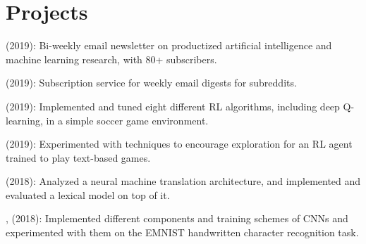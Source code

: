 \documentclass[]{deedy-resume-openfont}
\begin{document}
\begin{minipage}[t]{0.66\textwidth}


\section{Projects}

\href{https://dynamicallytyped.com}{} (2019): Bi-weekly email newsletter on productized artificial intelligence and machine learning research, with 80+ subscribers.

\vspace{0.3\topsep}
\href{https://weekly.cool}{} (2019): Subscription service for weekly email digests for subreddits.

\vspace{0.3\topsep}
\href{https://leonoverweel.com/projects/2019/rl-coursework/}{} (2019): Implemented and tuned eight different RL algorithms, including deep Q-learning, in a simple soccer game environment.

\vspace{0.3\topsep}
\href{https://leonoverweel.com/projects/2019/mlp-textworld-lstm-dqn/}{} (2019): Experimented with techniques to encourage exploration for an RL agent trained to play text-based games.

\vspace{0.3\topsep}
\href{https://leonoverweel.com/projects/2019/nlu-coursework/}{} (2018): Analyzed a neural machine translation architecture, and implemented and evaluated a lexical model on top of it.

\vspace{0.3\topsep}
\href{https://leonoverweel.com/projects/2018/mlp-1-emnist-learning-and-regularization/}{}, \href{https://leonoverweel.com/projects/2018/mlp-2-emnist-architectures/}{} (2018): Implemented different components and training schemes of CNNs and experimented with them on the EMNIST handwritten character recognition task.


\end{minipage}
\end{document}
